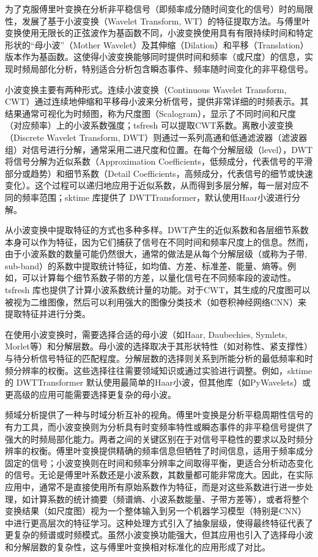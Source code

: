 为了克服傅里叶变换在分析非平稳信号（即频率成分随时间变化的信号）时的局限性，发展了基于小波变换（Wavelet Transform, WT）的特征提取方法。与傅里叶变换使用无限长的正弦波作为基函数不同，小波变换使用具有有限持续时间和特定形状的“母小波”（Mother Wavelet）及其伸缩（Dilation）和平移（Translation）版本作为基函数。这使得小波变换能够同时提供时间和频率（或尺度）的信息，实现时频局部化分析，特别适合分析包含瞬态事件、频率随时间变化的非平稳信号。

小波变换主要有两种形式。连续小波变换（Continuous Wavelet Transform, CWT）通过连续地伸缩和平移母小波来分析信号，提供非常详细的时频表示。其结果通常可视化为时频图，称为尺度图（Scalogram），显示了不同时间和尺度（对应频率）上的小波系数强度；tsfresh 可以提取CWT系数。离散小波变换（Discrete Wavelet Transform, DWT）则通过一系列高通和低通滤波器（滤波器组）对信号进行分解，通常采用二进尺度和位置。在每个分解层级（level），DWT将信号分解为近似系数（Approximation Coefficients，低频成分，代表信号的平滑部分或趋势）和细节系数（Detail Coefficients，高频成分，代表信号的细节或快速变化）。这个过程可以递归地应用于近似系数，从而得到多层分解，每一层对应不同的频率范围；sktime 库提供了 DWTTransformer，默认使用Haar小波进行分解。

从小波变换中提取特征的方式也多种多样。DWT产生的近似系数和各层细节系数本身可以作为特征，因为它们捕获了信号在不同时间和频率尺度上的信息。然而，由于小波系数的数量可能仍然很大，通常的做法是从每个分解层级（或称为子带, sub-band）的系数中提取统计特征，如均值、方差、标准差、能量、熵等。例如，可以计算每个细节系数子带的方差，以量化信号在不同频率段的波动性。tsfresh 库也提供了计算小波系数统计量的功能。对于CWT，其生成的尺度图可以被视为二维图像，然后可以利用强大的图像分类技术（如卷积神经网络CNN）来提取特征并进行分类。

在使用小波变换时，需要选择合适的母小波（如Haar, Daubechies, Symlets, Morlet等）和分解层数。母小波的选择取决于其形状特性（如对称性、紧支撑性）与待分析信号特征的匹配程度。分解层数的选择则关系到所能分析的最低频率和时频分辨率的权衡。这些选择往往需要领域知识或通过实验进行调整。例如，sktime 的 DWTTransformer 默认使用最简单的Haar小波，但其他库（如PyWavelets）或更高级的应用可能需要选择更复杂的母小波。

频域分析提供了一种与时域分析互补的视角。傅里叶变换是分析平稳周期性信号的有力工具，而小波变换则为分析具有时变频率特性或瞬态事件的非平稳信号提供了强大的时频局部化能力。两者之间的关键区别在于对信号平稳性的要求以及时频分辨率的权衡。傅里叶变换提供精确的频率信息但牺牲了时间信息，适用于频率成分固定的信号；小波变换则在时间和频率分辨率之间取得平衡，更适合分析动态变化的信号。无论是傅里叶系数还是小波系数，其数量都可能非常庞大。因此，在实际应用中，通常不是直接使用所有原始系数作为特征，而是对这些系数进行进一步处理，如计算系数的统计摘要（频谱熵、小波系数能量、子带方差等），或者将整个变换结果（如尺度图）视为一个整体输入到另一个机器学习模型（特别是CNN）中进行更高层次的特征学习。这种处理方式引入了抽象层级，使得最终特征代表了更复杂的频谱或时频模式。虽然小波变换功能强大，但其应用也引入了选择母小波和分解层数的复杂性，这与傅里叶变换相对标准化的应用形成了对比。


